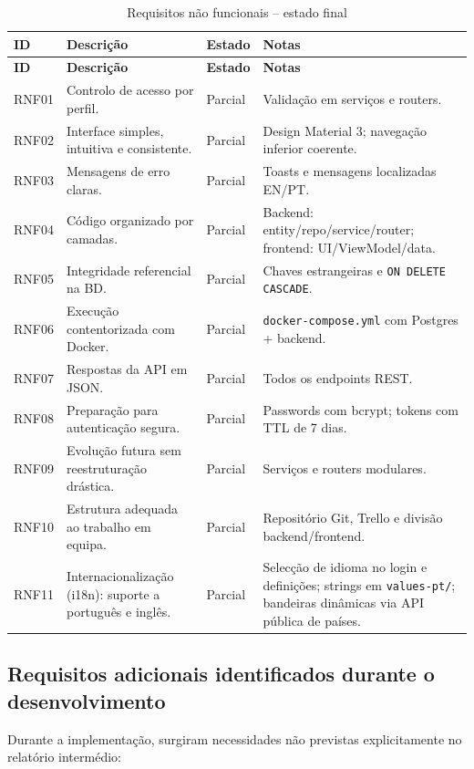 \documentclass[12pt,a4paper]{article}
\begin{document}
\begin{longtable}{|p{1.2cm}|p{7.5cm}|p{2.2cm}|p{3.3cm}|}
\caption{Requisitos não funcionais -- estado final}\label{tab:rnf}\\
\hline
\textbf{ID} & \textbf{Descrição} & \textbf{Estado} & \textbf{Notas}\\
\hline
\endfirsthead
\hline
\textbf{ID} & \textbf{Descrição} & \textbf{Estado} & \textbf{Notas}\\
\hline
\endhead
RNF01 & Controlo de acesso por perfil. & Parcial & Validação em serviços e routers.\\
\hline
RNF02 & Interface simples, intuitiva e consistente. & Parcial & Design Material 3; navegação inferior coerente.\\
\hline
RNF03 & Mensagens de erro claras. & Parcial & Toasts e mensagens localizadas EN/PT.\\
\hline
RNF04 & Código organizado por camadas. & Parcial & Backend: entity/repo/service/router; frontend: UI/ViewModel/data.\\
\hline
RNF05 & Integridade referencial na BD. & Parcial & Chaves estrangeiras e \texttt{ON DELETE CASCADE}.\\
\hline
RNF06 & Execução contentorizada com Docker. & Parcial & \texttt{docker-compose.yml} com Postgres + backend.\\
\hline
RNF07 & Respostas da API em JSON. & Parcial & Todos os endpoints REST.\\
\hline
RNF08 & Preparação para autenticação segura. & Parcial & Passwords com bcrypt; tokens com TTL de 7 dias.\\
\hline
RNF09 & Evolução futura sem reestruturação drástica. & Parcial & Serviços e routers modulares.\\
\hline
RNF10 & Estrutura adequada ao trabalho em equipa. & Parcial & Repositório Git, Trello e divisão backend/frontend.\\
\hline
RNF11 & Internacionalização (i18n): suporte a português e inglês. & Parcial & Selecção de idioma no login e definições; strings em \texttt{values-pt/}; bandeiras dinâmicas via API pública de países.\\
\hline
\end{longtable}

\subsection{Requisitos adicionais identificados durante o desenvolvimento}

Durante a implementação, surgiram necessidades não previstas explicitamente no relatório intermédio:
\end{document}
